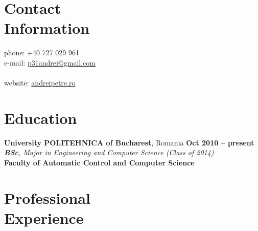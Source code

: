 \documentclass[margin,line]{resume}
\begin{document}
\begin{resume}

    \section{\mysidestyle Contact\\Information}

	phone: +40 727 029 961              \\
	e-mail:  \href{mailto:p31andrei@gmail.com}{p31andrei@gmail.com}  \vspace{0mm}\\\vspace{-4.5mm}\\%
	website: \href{http://andreipetre.ro}{andreipetre.ro}

    \section{\mysidestyle Education}

	\textbf{University POLITEHNICA of Bucharest}, Romania \hfill \textbf{ Oct 2010 -- present}\vspace{1.2mm}\\%
	\textsl{\textbf{BSc}, Major in Engineering and Computer Science (Class of 2014)}\vspace{1.5mm}\\
	\small{\textbf{Faculty of Automatic Control and Computer Science}}

    \section{\mysidestyle Professional\\Experience}


\end{resume}
\end{document}
